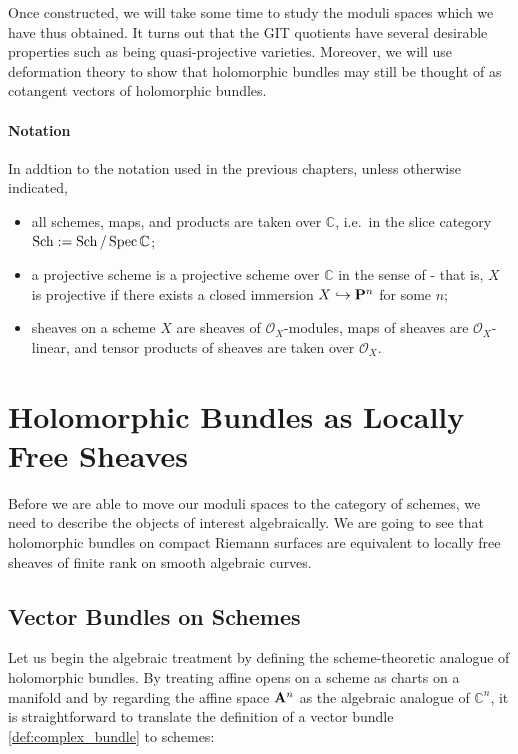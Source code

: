 \documentclass[12pt]{ociamthesis}  %
\begin{document}
Once constructed, we will take some time to study the moduli
spaces which we have thus obtained. It turns out that the GIT
quotients have several desirable properties such as being
quasi-projective varieties. Moreover, we will use deformation
theory to show that holomorphic bundles may still be thought
of as cotangent vectors of holomorphic bundles.

\paragraph*{Notation}

In addtion to the notation used in the previous chapters, unless
otherwise indicated,
\begin{itemize}
  \item all schemes, maps, and products are taken over $\mathbb{C}$,
        i.e.~in the slice category $\operatorname{Sch} := \operatorname{Sch}/\operatorname{Spec}\mathbb{C}$;
  \item a projective scheme is a projective scheme over $\mathbb{C}$
        in the sense of \cite{hartshorne1977} - that is, $X$ is projective
        if there exists a closed immersion $X\hookrightarrow\mathbf{P}^{n}_{}$ for
        some $n$;
  \item sheaves on a scheme $X$ are sheaves of $\mathscr O_X$-modules,
        maps of sheaves are $\mathscr O_X$-linear, and tensor products
        of sheaves are taken over $\mathscr O_X$.
\end{itemize}

\section{Holomorphic Bundles as Locally Free Sheaves}

Before we are able to move our moduli spaces to the category of
schemes, we need to describe the objects of interest algebraically.
We are going to see that holomorphic bundles on
compact Riemann surfaces are equivalent to locally free sheaves
of finite rank on smooth algebraic curves.

\subsection{Vector Bundles on Schemes}

Let us begin the algebraic treatment by defining the scheme-theoretic
analogue of holomorphic bundles. By treating affine opens on a scheme as charts on a manifold
and by regarding the affine space $\mathbf{A}^{n}_{}$ as the algebraic
analogue of $\mathbb C^n$, it is straightforward to translate
the definition of a vector bundle \ref{def:complex_bundle} to schemes:
\end{document}
